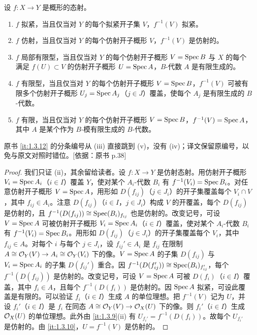 \begin{proposition}\label{it:1.3.12}
设 $f\colon X\to Y$ 是概形的态射。
\begin{enumerate}[label=(\roman*),leftmargin=2.8em]
  \item $f$ 拟紧，当且仅当对 $Y$ 的每个拟紧开子集 $V$，$f^{-1}(V)$ 拟紧。
  \item $f$ 仿射，当且仅当对 $Y$ 的每个仿射开子概形 $V$，$f^{-1}(V)$ 是仿射的。
  \item $f$ 局部有限型，当且仅当对 $Y$ 的每个仿射开子概形 $V=\operatorname{Spec} B$ 与 $X$ 的每个满足 $f(U)\subset V$ 的仿射开子概形 $U=\operatorname{Spec} A$，$B$-代数 $A$ 是有限生成的。
  \item[(v)] $f$ 有限型，当且仅当对 $Y$ 的每个仿射开子概形 $V=\operatorname{Spec} B$，$f^{-1}(V)$ 可被有限多个仿射开子概形 $U_j=\operatorname{Spec} A_j$（$j\in J$）覆盖，使每个 $A_j$ 是有限生成的 $B$-代数。
  \item[(vi)] $f$ 有限，当且仅当对 $Y$ 的每个仿射开子概形 $V=\operatorname{Spec} B$，$f^{-1}(V)=\operatorname{Spec} A$，其中 $A$ 是某个作为 $B$-模有限生成的 $B$-代数。
\end{enumerate}
\end{proposition}

\begin{tnote}
原书 \ref{it:1.3.12} 的分条编号从 (iii) 直接跳到 (v)，没有 (iv)；译文保留原编号，以免与原文对照时错位。[依据：原书 p.38]
\end{tnote}

\begin{proof}
我们只证 (ii)，其余留给读者。设 $f\colon X\to Y$ 是仿射态射。用仿射开子概形 $V_i=\operatorname{Spec} A_i$（$i\in I$）覆盖 $Y$，使对某个 $A_i$-代数 $B_i$ 有 $f^{-1}(V_i)=\operatorname{Spec} B_i$。对任意仿射开子概形 $V=\operatorname{Spec} A$，用形如 $D(f_{ij})$（$j\in J_i$）的开子集覆盖每个 $V_i\cap V$，其中 $f_{ij}\in A_i$。注意 $D(f_{ij})$（$i\in I$，$j\in J_i$）构成 $V$ 的开覆盖，每个 $D(f_{ij})$ 是仿射的，且 $f^{-1}(D(f_{ij}))\cong \operatorname{Spec}(B_i)_{f_{ij}}$ 也是仿射的。改变记号，可设 $V=\operatorname{Spec} A$ 可被仿射开子概形 $V_i=\operatorname{Spec} A_i$（$i\in I$）覆盖，使对某个 $A_i$-代数 $B_i$ 有 $f^{-1}(V_i)=\operatorname{Spec} B_i$。用形如 $D(f_{ij})$（$j\in J_i$）的开子集覆盖每个 $V_i$，其中 $f_{ij}\in A$。对每个 $i$ 与每个 $j\in J_i$，设 $f_{ij}'\in A_i$ 是 $f_{ij}$ 在限制 $A\cong \mathcal{O}_Y(V)\to A_i\cong \mathcal{O}_Y(V_i)$ 下的像。$V=\operatorname{Spec} A$ 的子集 $D(f_{ij})$ 与 $V_i=\operatorname{Spec} A_i$ 的子集 $D(f_{ij}')$ 重合。因 $f^{-1}(D(f_{ij}'))\cong \operatorname{Spec}(B_i)_{f_{ij}'}$，每个 $f^{-1}(D(f_{ij}))$ 是仿射的。改变记号，可设 $V=\operatorname{Spec} A$ 可被 $D(f_i)$（$i\in I$）覆盖，其中 $f_i\in A$，且每个 $f^{-1}(D(f_i))$ 是仿射的。因 $\operatorname{Spec} A$ 拟紧，可设此覆盖是有限的。可以验证 $f_i$（$i\in I$）生成 $A$ 的单位理想。把 $f^{-1}(V)$ 记为 $U$，并设 $f_i'$（$i\in I$）是 $f_i$ 在同态 $A\cong \mathcal{O}_Y(V)\to \mathcal{O}_X(U)$ 下的像。则 $f_i'$（$i\in I$）生成 $\mathcal{O}_X(U)$ 的单位理想。此外由 \ref{it:1.3.9}(ii) 有 $U_{f_i'}=f^{-1}(D(f_i))$。故每个 $U_{f_i'}$ 是仿射的。由 \ref{it:1.3.10}，$U=f^{-1}(V)$ 是仿射的。
\end{proof}

